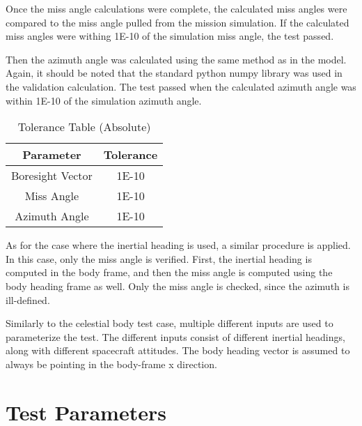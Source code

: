 Once the miss angle calculations were complete, the calculated miss angles were compared to the miss angle pulled from the mission simulation. If the calculated miss angles were withing 1E-10 of the simulation miss angle, the test passed.

Then the azimuth angle was calculated using the same method as in the model. Again, it should be noted that the standard python numpy library was used in the validation calculation. The test passed when the calculated azimuth angle was within 1E-10 of the simulation azimuth angle.  

\begin{table}[htbp]
	\caption{Tolerance Table (Absolute)}
	\label{tab:label}
	\centering \fontsize{10}{10}\selectfont
	\begin{tabular}{ c | c } %
		\hline 
		Parameter & Tolerance\\
		\hline 
		Boresight Vector & 1E-10 \\
		Miss Angle & 1E-10 \\
		Azimuth Angle & 1E-10 \\
		\hline
	\end{tabular}
\end{table}

As for the case where the inertial heading is used, a similar procedure is applied. In this case, only the miss angle is verified. First, the inertial heading is computed in the body frame, and then the miss angle is computed using the body heading frame as well. Only the miss angle is checked, since the azimuth is ill-defined.

Similarly to the celestial body test case, multiple different inputs are used to parameterize the test. The different inputs consist of different inertial headings, along with different spacecraft attitudes. The body heading vector is assumed to always be pointing in the body-frame x direction.

\section{Test Parameters}

